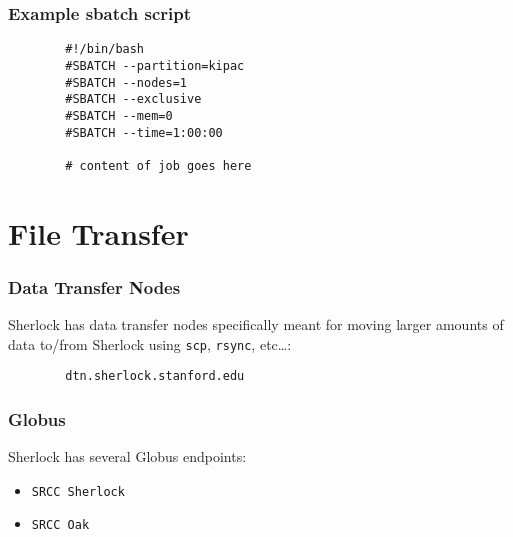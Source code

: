 \documentclass[aspectratio=169]{beamer}
\begin{document}
\begin{frame}[fragile]
	\frametitle{Example sbatch script}
	\begin{verbatim}
		#!/bin/bash
		#SBATCH --partition=kipac
		#SBATCH --nodes=1
		#SBATCH --exclusive
		#SBATCH --mem=0
		#SBATCH --time=1:00:00
		
		# content of job goes here
	\end{verbatim}
\end{frame}




\section{File Transfer}

\frame{\sectionpage}

\begin{frame}[fragile]
	\frametitle{Data Transfer Nodes}
	Sherlock has data transfer nodes specifically meant for moving larger amounts of data to/from Sherlock using \texttt{scp}, \texttt{rsync}, etc\ldots:
	\begin{verbatim}
		dtn.sherlock.stanford.edu
	\end{verbatim}
\end{frame}

\begin{frame}
	\frametitle{Globus}
	Sherlock has several Globus endpoints:
	\begin{itemize}
		\item \texttt{SRCC Sherlock}
		\item \texttt{SRCC Oak}
	\end{itemize}
\end{frame}

\end{document}
